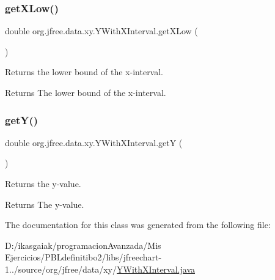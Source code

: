 \subsubsection{\texorpdfstring{get\+X\+Low()}{getXLow()}}
{\footnotesize\ttfamily double org.\+jfree.\+data.\+xy.\+Y\+With\+X\+Interval.\+get\+X\+Low (\begin{DoxyParamCaption}{ }\end{DoxyParamCaption})}

Returns the lower bound of the x-\/interval.

\begin{DoxyReturn}{Returns}
The lower bound of the x-\/interval. 
\end{DoxyReturn}
\mbox{\label{classorg_1_1jfree_1_1data_1_1xy_1_1_y_with_x_interval_a02cb7fa3c59c125eb937d2d76ca1ad49}} 
\subsubsection{\texorpdfstring{get\+Y()}{getY()}}
{\footnotesize\ttfamily double org.\+jfree.\+data.\+xy.\+Y\+With\+X\+Interval.\+getY (\begin{DoxyParamCaption}{ }\end{DoxyParamCaption})}

Returns the y-\/value.

\begin{DoxyReturn}{Returns}
The y-\/value. 
\end{DoxyReturn}


The documentation for this class was generated from the following file\+:\begin{DoxyCompactItemize}
\item 
D\+:/ikasgaiak/programacion\+Avanzada/\+Mis Ejercicios/\+P\+B\+Ldefinitibo2/libs/jfreechart-\/1../source/org/jfree/data/xy/\mbox{\hyperlink{_y_with_x_interval_8java}{Y\+With\+X\+Interval.\+java}}\end{DoxyCompactItemize}
